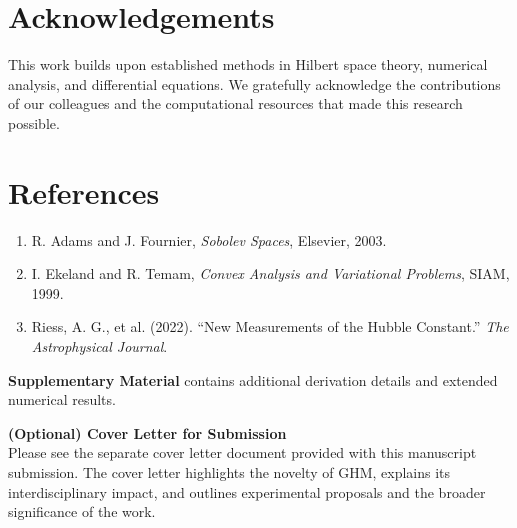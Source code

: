 \documentclass[11pt]{article}
\begin{document}
\section*{Acknowledgements}

This work builds upon established methods in Hilbert space theory, numerical analysis, and differential equations. We gratefully acknowledge the contributions of our colleagues and the computational resources that made this research possible.

\section*{References}
\begin{enumerate}
    \item R. Adams and J. Fournier, \emph{Sobolev Spaces}, Elsevier, 2003.
    \item I. Ekeland and R. Temam, \emph{Convex Analysis and Variational Problems}, SIAM, 1999.
    \item Riess, A. G., et al. (2022). ``New Measurements of the Hubble Constant.'' \emph{The Astrophysical Journal}.
\end{enumerate}

\bigskip

\noindent
\textbf{Supplementary Material} contains additional derivation details and extended numerical results.

\bigskip

\noindent
\textbf{(Optional) Cover Letter for Submission}\\
Please see the separate cover letter document provided with this manuscript submission. The cover letter highlights the novelty of GHM, explains its interdisciplinary impact, and outlines experimental proposals and the broader significance of the work.
\end{document}
